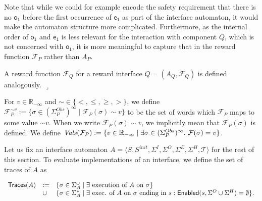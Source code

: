 \documentclass[10pt,a4paper]{article}
\begin{document}
 
 
Note that while we could for example encode the safety requirement that there is no $\mathsf{o_{1}}$ before the first occurrence of $\mathsf{e_{1}}$ as part of the interface automaton, it would make the automaton structure more complicated. Furthermore, as the internal order of $\mathsf{o_{1}}$ and $\mathsf{e_{1}}$ is less relevant for the interaction with component $Q$, which is not concerned with $\mathsf{o_{1}}$, it is more meaningful to capture that in the reward function $\mathcal{F}_{P}$ rather than $A_{P}$.\par
 
 
 
A reward function $\mathcal{F}_{Q}$ for a reward interface $Q=(A_{Q},\mathcal{F}_{Q})$ is defined analogously. $\lrcorner$\par
 
 
 
 
For $v\in\mathbb{R}_{-\infty}$ and $\sim\in\{<,\leq,\geq,>\}$, we define $\mathcal{F}_{P}^{\sim v}:=\{\sigma\in(\Sigma^{Obs}_{P})^{\infty}\mid\mathcal{F}_{P}(\sigma)\sim v\}$ to be the set of words which $\mathcal{F}_{P}$ maps to some value $\sim v$. When we write $\mathcal{F}_{P}(\sigma)\sim v$, we implicitly mean that $\mathcal{F}_{P}(\sigma)$ is defined. We define $\mathit{Vals}(\mathcal{F}_{P}):=\{v\in\mathbb{R}_{-\infty}\mid\exists\sigma\in(\Sigma^{Obs}_{P})^{\infty}.\nobreak\ \mathcal{F}(\sigma)=v\}$.\par
 
 
 
Let us fix an interface automaton $A=\langle S,S^{init},\Sigma^{I},\Sigma^{O},\Sigma^{E},\Sigma^{H},\mathcal{T}\rangle$ for the rest of this section. To evaluate implementations of an interface, we define the set of traces of $A$ as\par
  
\par  \quad  \[\begin{array}[]{lll}\mathsf{Traces}(A)&:=&\{\sigma\in\Sigma_{A}^{\omega}\mid\exists\nobreak\ \text{execution of }A\text{ on }\sigma\}\\
&\cup&\{\sigma\in\Sigma_{A}^{*}\mid\exists\nobreak\ \text{exec. of }A\text{ on }\sigma\text{ ending in }s:\mathsf{Enabled}(s,\Sigma^{O}\cup\Sigma^{H})=\emptyset\}.\end{array}\]\quad  \quad  
  
\end{document}
